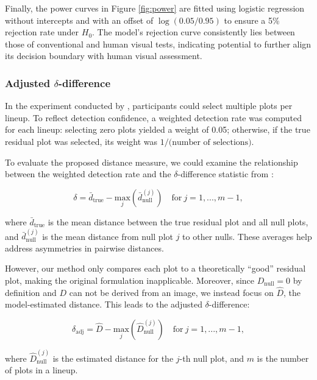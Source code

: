 \documentclass[]{interact}
\theoremstyle{plain}%
\theoremstyle{definition}
\theoremstyle{remark}
\begin{document}
Finally, the power curves in Figure \ref{fig:power} are fitted using
logistic regression without intercepts and with an offset of
\(\log(0.05/0.95)\) to ensure a 5\% rejection rate under \(H_0\). The
model's rejection curve consistently lies between those of conventional
and human visual tests, indicating potential to further align its
decision boundary with human visual assessment.

\subsubsection{\texorpdfstring{Adjusted
\(\delta\)-difference}{Adjusted \textbackslash delta-difference}}\label{adjusted-delta-difference}

In the experiment conducted by \citet{li2024plot}, participants could
select multiple plots per lineup. To reflect detection confidence, a
weighted detection rate was computed for each lineup: selecting zero
plots yielded a weight of 0.05; otherwise, if the true residual plot was
selected, its weight was \(1 / \text{(number of selections)}\).

To evaluate the proposed distance measure, we could examine the
relationship between the weighted detection rate and the
\(\delta\)-difference statistic from \citet{chowdhury2018measuring}:

\[
\delta = \bar{d}_{\text{true}} - \underset{j}{\text{max}}\left(\bar{d}_{\text{null}}^{(j)}\right) \quad \text{for}~j = 1,...,m-1,
\]

\noindent where \(\bar{d}_{\text{true}}\) is the mean distance between
the true residual plot and all null plots, and
\(\bar{d}_{\text{null}}^{(j)}\) is the mean distance from null plot
\(j\) to other nulls. These averages help address asymmetries in
pairwise distances.

However, our method only compares each plot to a theoretically ``good''
residual plot, making the original formulation inapplicable. Moreover,
since \(D_{\text{null}} = 0\) by definition and \(D\) can not be derived
from an image, we instead focus on \(\hat{D}\), the model-estimated
distance. This leads to the adjusted \(\delta\)-difference:

\[
\delta_{\text{adj}} = \hat{D} - \underset{j}{\text{max}}\left(\hat{D}_{\text{null}}^{(j)}\right) \quad \text{for}~j = 1,...,m-1,
\]

\noindent where \(\hat{D}_{\text{null}}^{(j)}\) is the estimated
distance for the \(j\)-th null plot, and \(m\) is the number of plots in
a lineup.
\end{document}
